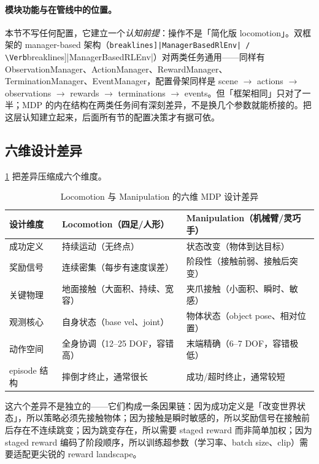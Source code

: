 \paragraph{模块功能与在管线中的位置。}本节不写任何配置，它建立一个\emph{认知前提}：操作不是「简化版 locomotion」。双框架的 manager-based 架构（\Verb[breaklines]|ManagerBasedRlEnv| / \Verb[breaklines]|ManagerBasedRLEnv|）对两类任务通用——同样有 ObservationManager、ActionManager、RewardManager、TerminationManager、EventManager，配置骨架同样是 scene $\to$ actions $\to$ observations $\to$ rewards $\to$ terminations $\to$ events。但「框架相同」只对了一半；MDP 的内在结构在两类任务间有深刻差异，不是换几个参数就能桥接的。把这层认知建立起来，后面所有节的配置决策才有据可依。

\subsection{六维设计差异}
\label{sec:rlmc-manip-sixdim}

\cref{tab:rlmc-manip-sixdim} 把差异压缩成六个维度。

\begin{table}[ht]
\centering
\small
\caption{Locomotion 与 Manipulation 的六维 MDP 设计差异}
\label{tab:rlmc-manip-sixdim}
\begin{tabular}{@{}lll@{}}
\toprule
设计维度 & Locomotion（四足/人形） & Manipulation（机械臂/灵巧手） \\
\midrule
成功定义 & 持续运动（无终点） & 状态改变（物体到达目标） \\
奖励信号 & 连续密集（每步有速度误差） & 阶段性（接触前弱、接触后突变） \\
关键物理 & 地面接触（大面积、持续、宽容） & 夹爪接触（小面积、瞬时、敏感） \\
观测核心 & 自身状态（base vel、joint） & 物体状态（object pose、相对位置） \\
动作空间 & 全身协调（12--25 DOF，容错高） & 末端精确（6--7 DOF，容错极低） \\
episode 结构 & 摔倒才终止，通常很长 & 成功/超时终止，通常较短 \\
\bottomrule
\end{tabular}
\end{table}

这六个差异不是独立的——它们构成一条因果链：因为成功定义是「改变世界状态」，所以策略必须先接触物体；因为接触是瞬时敏感的，所以奖励信号在接触前后存在不连续跳变；因为跳变存在，所以需要 staged reward 而非简单加权；因为 staged reward 编码了阶段顺序，所以训练超参数（学习率、batch size、clip）需要适配更尖锐的 reward landscape。

